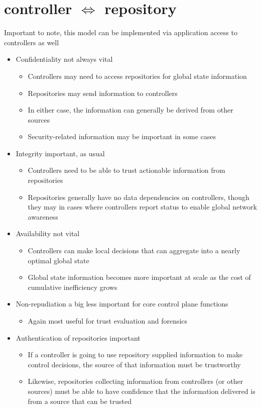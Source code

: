 \documentclass[12pt,letterpaper]{article}
\begin{document}
\newpage
\section{controller $\Longleftrightarrow$ repository}
Important to note, this model can be implemented via application access to controllers as well
\begin{itemize}
\item {\color{orange} Confidentiality not always vital}
	\begin{itemize}
	\item Controllers may need to access repositories for global state information
	\item Repositories may send information to controllers
	\item In either case, the information can generally be derived from other sources
	\item Security-related information may be important in some cases
	\end{itemize}
\item {\color{red} Integrity important, as usual}
	\begin{itemize}
	\item Controllers need to be able to trust actionable information from repositories
	\item Repositories generally have no data dependencies on controllers, though they may in cases where controllers report status to enable global network awareness
	\end{itemize}
\item {\color{green} Availability not vital} 
	\begin{itemize}
	\item Controllers can make local decisions that can aggregate into a nearly optimal global state
	\item Global state information becomes more important at scale as the cost of cumulative inefficiency grows
	\end{itemize}
\item {\color{green} Non-repudiation a big less important for core control plane functions}
	\begin{itemize}
	\item Again most useful for trust evaluation and forensics
	\end{itemize}
\item {\color{red} Authentication of repositories important}
	\begin{itemize}
	\item If a controller is going to use repository supplied information to make control decisions, the source of that information must be trustworthy
	\item Likewise, repositories collecting information from controllers (or other sources) must be able to have confidence that the information delivered is from a source that can be trusted
	\end{itemize}
\end{itemize}
\end{document}
